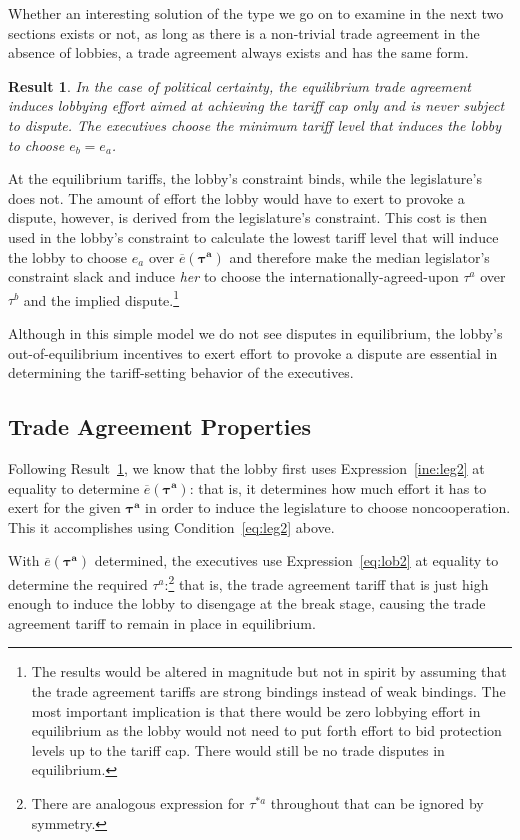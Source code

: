 \documentclass[authoryear, review]{elsarticle}
\newtheorem{result}{Result}
\newcommand{\ov}{\overline}
\newcommand{\bta}{\bm{\tau^a}}
\begin{document}
Whether an interesting solution of the type we go on to examine in the next two sections exists or not, as long as there is a non-trivial trade agreement in the absence of lobbies, a trade agreement always exists and has the same form.				

\begin{result}
  In the case of political certainty, the equilibrium trade agreement induces lobbying effort aimed at achieving the tariff cap only and is never subject to dispute. The executives choose the minimum tariff level that induces the lobby to choose $e_b=e_a$.
  \label{res:eqm}
\end{result}
At the equilibrium tariffs, the lobby's constraint binds, while the legislature's does not. The amount of effort the lobby would have to exert to provoke a dispute, however, is derived from the legislature's constraint. This cost is then used in the lobby's constraint to calculate the lowest tariff level that will induce the lobby to choose $e_a$ over $\ov{e}(\bta)$ and therefore make the median legislator's constraint slack and induce \textit{her} to choose the internationally-agreed-upon $\tau^a$ over $\tau^b$ and the implied dispute.\footnote{The results would be altered in magnitude but not in spirit by assuming that the trade agreement tariffs are strong bindings instead of weak bindings. The most important implication is that there would be zero lobbying effort in equilibrium as the lobby would not need to put forth effort to bid protection levels up to the tariff cap. There would still be no trade disputes in equilibrium.}

Although in this simple model we do not see disputes in equilibrium, the lobby's out-of-equilibrium incentives to exert effort to provoke a dispute are essential in determining the tariff-setting behavior of the executives.

\subsection{Trade Agreement Properties}
Following Result~\ref{res:eqm}, we know that the lobby first uses Expression~\ref{ine:leg2} at equality to determine $\ov{e}(\bta)$: that is, it determines how much effort it has to exert for the given $\bta$ in order to induce the legislature to choose noncooperation. This it accomplishes using Condition~\ref{eq:leg2} above.

With $\ov{e}(\bta)$ determined, the executives use Expression~\ref{eq:lob2} at equality to determine the required $\tau^a$:\footnote{There are analogous expression for $\tau^{*a}$ throughout that can be ignored by symmetry.} that is, the trade agreement tariff that is just high enough to induce the lobby to disengage at the break stage, causing the trade agreement tariff to remain in place in equilibrium.
\end{document}
